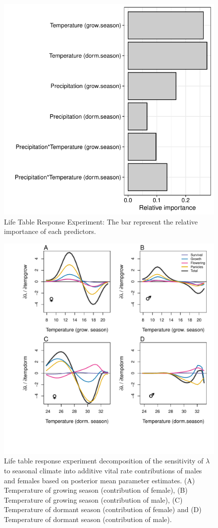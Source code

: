 \documentclass[12pt]{article}
\begin{document}
\begin{figure}[H]
  \begin{center}
    \includegraphics[width=0.65\linewidth]{Figures/Fig_LTRE.pdf}
  \caption{Life Table Response Experiment: The bar represent the relative importance of each predictors.}
  \label{Sup:LTRE}
  \end{center}
\end{figure}

\begin{figure}[H]
  \begin{center}
    \includegraphics[width=0.95\linewidth]{Figures/LTRE_Temperature.pdf}
  \caption{Life table response experiment decomposition of the sensitivity of $\lambda$ to seasonal climate into additive vital rate contributions of males and females based on posterior mean parameter estimates.
 (A) Temperature of growing season (contribution of female), (B) Temperature of growing season (contribution of male),  (C) Temperature of dormant season (contribution of female) and (D) Temperature of dormant season (contribution of male).}
  \label{Sup:LTRETemp}
  \end{center}
\end{figure}
\end{document}
